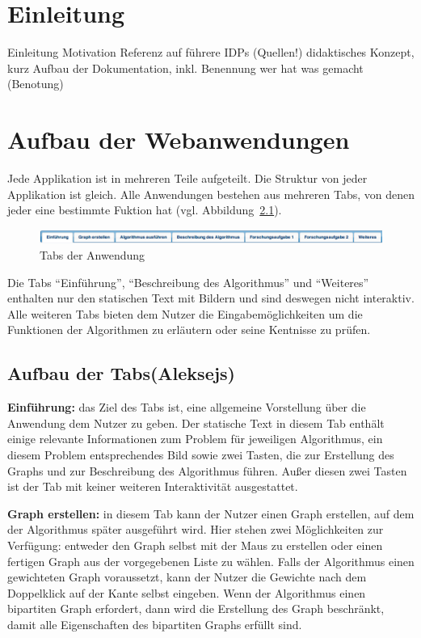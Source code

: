 \chapter{Einleitung}
Einleitung
Motivation
Referenz auf führere IDPs (Quellen!)
didaktisches Konzept, kurz
Aufbau der Dokumentation, inkl. Benennung wer hat was gemacht (Benotung)


\chapter{Aufbau der Webanwendungen}
Jede Applikation ist in mehreren Teile aufgeteilt. Die Struktur von jeder Applikation ist gleich. Alle Anwendungen bestehen aus mehreren Tabs, von denen jeder eine bestimmte Fuktion hat (vgl. Abbildung~\ref{fig:tabs}).

\begin{figure}[h!]
	\centering
	\includegraphics[width=\textwidth]{figures/tabs}
	\caption[Tabs]{Tabs der Anwendung}\label{fig:tabs}
\end{figure}

Die Tabs ``Einführung'', ``Beschreibung des Algorithmus'' und ``Weiteres'' enthalten nur den statischen Text mit Bildern und sind deswegen nicht interaktiv. Alle weiteren Tabs bieten dem Nutzer die Eingabemöglichkeiten um die Funktionen der Algorithmen zu erläutern oder seine Kentnisse zu prüfen. 

\section{Aufbau der Tabs(Aleksejs)}
\textbf{Einführung:} das Ziel des Tabs ist, eine allgemeine Vorstellung über die Anwendung dem Nutzer zu geben. Der statische Text in diesem Tab enthält einige relevante Informationen zum Problem für jeweiligen Algorithmus, ein diesem Problem entsprechendes Bild sowie zwei Tasten, die zur Erstellung des Graphs und zur Beschreibung des Algorithmus führen. Außer diesen zwei Tasten ist der Tab mit keiner weiteren Interaktivität ausgestattet.


\noindent\textbf{Graph erstellen:} in diesem Tab kann der Nutzer einen Graph erstellen, auf dem der Algorithmus später ausgeführt wird. Hier stehen zwei Möglichkeiten zur Verfügung: entweder den Graph selbst mit der Maus zu erstellen oder einen fertigen Graph aus der vorgegebenen Liste zu wählen. Falls der Algorithmus einen gewichteten Graph voraussetzt, kann der Nutzer die Gewichte nach dem Doppelklick auf der Kante selbst eingeben. Wenn der Algorithmus einen bipartiten Graph erfordert, dann wird die Erstellung des Graph beschränkt, damit alle Eigenschaften des bipartiten Graphs erfüllt sind. 


